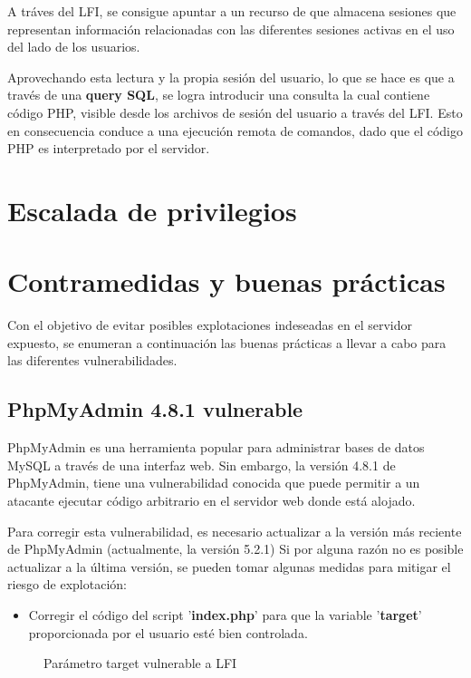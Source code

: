 \documentclass[a4paper]{article} %
\begin{document}
   \clearpage
  A tráves del LFI, se consigue apuntar a un recurso de que almacena sesiones que representan información relacionadas con las diferentes sesiones
  activas en el uso del lado de los usuarios.

  Aprovechando esta lectura y la propia sesión del usuario, lo que se hace es que a través de una \textbf{query SQL}, se logra introducir una consulta
  la cual contiene código PHP, visible desde los archivos de sesión del usuario a través del LFI. Esto en consecuencia conduce a una ejecución remota de comandos, 
  dado que el código PHP es interpretado por el servidor. 

  \section{Escalada de privilegios}
  \section{Contramedidas y buenas prácticas}
  Con el objetivo de evitar posibles explotaciones indeseadas en el servidor expuesto, se enumeran a continuación las buenas prácticas
  a llevar a cabo para las diferentes vulnerabilidades. 

  \subsection{PhpMyAdmin 4.8.1 vulnerable}
  PhpMyAdmin es una herramienta popular para administrar bases de datos MySQL a través de una interfaz web. Sin 
  embargo, la versión 4.8.1 de PhpMyAdmin, tiene una vulnerabilidad conocida que puede permitir a un atacante ejecutar código 
  arbitrario en el servidor web donde está alojado. 

  Para corregir esta vulnerabilidad, es necesario actualizar a la versión más reciente de PhpMyAdmin (actualmente, la versión 5.2.1)
  Si por alguna razón no es posible actualizar a la última versión, se pueden tomar algunas medidas para mitigar el riesgo de 
  explotación:
  \begin{itemize} 
    \item Corregir el código del script '\textbf{index.php}' para que la variable '\textbf{target}' proporcionada por el usuario 
      esté bien controlada. 
    \end{itemize}

  \vspace{0.2cm}
  \begin{figure}[h]
    \centering 
    \setlength{\fboxrule}{0.8pt}  
    \caption{Parámetro target vulnerable a LFI}
  \end{figure}
\end{document}
